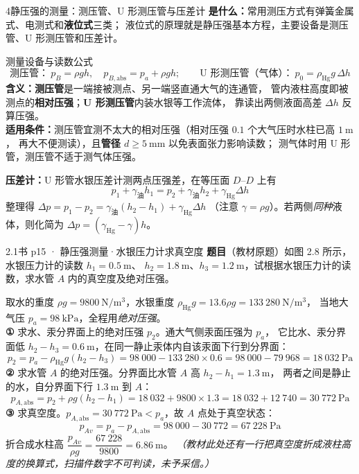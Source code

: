 \begin{kaodian}{4}{静压强的测量：测压管、U 形测压管与压差计}
\textbf{是什么：}常用测压方式有弹簧金属式、电测式和\textbf{液位式}三类；
液位式的原理就是静压强基本方程，主要设备是测压管、U 形测压管和压差计。

\begin{gongshi}{测量设备与读数公式}
\[
\text{测压管：}\ p_B=\rho g h,\quad p_{B,\text{abs}}=p_a+\rho g h;\qquad
\text{U 形测压管（气体）：}\ p_0=\rho_{\text{Hg}}g\,\Delta h
\]
\textbf{含义：}\textbf{测压管}是一端接被测点、另一端竖直通大气的连通管，
管内液柱高度即被测点的\textbf{相对压强}；\textbf{U 形测压管}内装水银等工作流体，
靠读出两侧液面高差 $\Delta h$ 反算压强。\\
\textbf{适用条件：}测压管宜测不太大的相对压强（相对压强 $0.1$ 个大气压时水柱已高 $1\ \mathrm{m}$，
再大不便测读），且\textbf{管径 $d\ge5\ \mathrm{mm}$} 以免表面张力影响读数；
测气体时用 U 形管，测压管不适于测气体压强。
\end{gongshi}

\textbf{压差计：}U 形管水银压差计测两点压强差，在等压面 $D$--$D$ 上有
\[ p_1+\gamma_{\text{油}}h_1=p_2+\gamma_{\text{油}}h_2+\gamma_{\text{Hg}}\Delta h \]
整理得 $\Delta p=p_1-p_2=\gamma_{\text{油}}(h_2-h_1)+\gamma_{\text{Hg}}\Delta h$
（注意 $\gamma=\rho g$）。若两侧\emph{同种}液体，则化简为 $\Delta p=(\gamma_{\text{Hg}}-\gamma)h$。

\begin{liti}{2.1}{书 p15 · 静压强测量·水银压力计求真空度}
\textbf{题目}（教材原题）如图 2.8 所示，水银压力计的读数 $h_1=0.5\ \mathrm{m}$、
$h_2=1.8\ \mathrm{m}$、$h_3=1.2\ \mathrm{m}$，试根据水银压力计的读数，求水管 $A$ 内的真空度及绝对压强。

\begin{jie}
取水的重度 $\rho g=9800\ \mathrm{N/m^3}$，水银重度 $\rho_{\text{Hg}}g=13.6\rho g=133\ 280\ \mathrm{N/m^3}$，
当地大气压 $p_a=98\ \mathrm{kPa}$，全程用\emph{绝对压强}。\\
\textbf{① }求水、汞分界面上的绝对压强 $p_2$。通大气侧汞面压强为 $p_a$，
它比水、汞分界面低 $h_2-h_3=0.6\ \mathrm{m}$，在同一静止汞体内自该汞面下行到分界面：
\[ p_2=p_a-\rho_{\text{Hg}}g(h_2-h_3)=98\ 000-133\ 280\times0.6=98\ 000-79\ 968=18\ 032\ \mathrm{Pa} \]
\textbf{② }求水管 $A$ 的绝对压强。分界面比水管 $A$ 高 $h_2-h_1=1.3\ \mathrm{m}$，
两者之间是静止的水，自分界面下行 $1.3\ \mathrm{m}$ 到 $A$：
\[ p_{A,\text{abs}}=p_2+\rho g(h_2-h_1)=18\ 032+9800\times1.3=18\ 032+12\ 740=30\ 772\ \mathrm{Pa} \]
\textbf{③ }求真空度。$p_{A,\text{abs}}=30\ 772\ \mathrm{Pa}<p_a$，故 $A$ 点处于真空状态：
\[ p_{Av}=p_a-p_{A,\text{abs}}=98\ 000-30\ 772=67\ 228\ \mathrm{Pa} \]
折合成水柱高 $\dfrac{p_{Av}}{\rho g}=\dfrac{67\ 228}{9800}=6.86\ \mathrm{m}$。
\emph{（教材此处还有一行把真空度折成液柱高度的换算式，扫描件数字不可判读，未予采信。）}
\end{jie}
\end{liti}


\end{kaodian}
